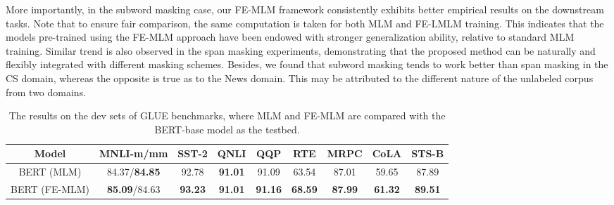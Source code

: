 \documentclass{article} \usepackage{iclr2021_conference,times}
\newcommand{\tf}[1]{\textbf{#1}}
\theoremstyle{plain}
\begin{document}
More importantly, in the subword masking case, our FE-MLM framework consistently exhibits better empirical results on the downstream tasks.
Note that to ensure fair comparison, the same computation is taken for both MLM and FE-LMLM training.
This indicates that the models pre-trained using the FE-MLM approach have been endowed with stronger generalization ability, relative to standard MLM training. 
Similar trend is also observed in the span masking experiments, demonstrating that the proposed method can be naturally and flexibly integrated with different masking schemes.
Besides, we found that subword masking tends to work better than span masking in the CS domain, whereas the opposite is true as to the News domain. This may be attributed to the different nature of the unlabeled corpus from two domains.

\begin{table*} [t]
	\centering
	\begin{small}
		\vspace{0mm}
		\setlength{\tabcolsep}{5pt}
		\def\arraystretch{1.0}
		\begin{tabular}{c||c|c|c|c|c|c|c|c}
			\toprule[1.2pt]
			\tf{Model} & \tf{MNLI-m/mm}  & \tf{SST-2} & \tf{QNLI}    & \tf{QQP} & \tf{RTE} & \tf{MRPC}  & \tf{CoLA} & \tf{STS-B} \\
			\hline
			BERT (MLM)  & 84.37/\tf{84.85} & 92.78 & \tf{91.01}  & 91.09  & 63.54 & 87.01 & 59.65 & 87.89 \\
			BERT (FE-MLM) & \tf{85.09}/84.63 & \tf{93.23} & \tf{91.01} & \tf{91.16} & \tf{68.59} & \tf{87.99} & \tf{61.32} & \tf{89.51} \\			 
			\bottomrule[1.2pt]
		\end{tabular}\caption{The results on the dev sets of GLUE benchmarks, where MLM and FE-MLM are compared with the BERT-base model as the testbed.}
		\label{tab:eval_1}
	\end{small}
	\vspace{-4mm}
\end{table*}
\vspace{-2mm}
\end{document}
